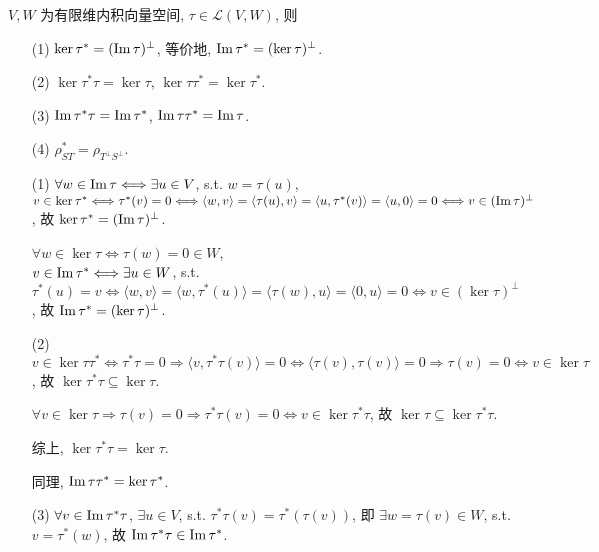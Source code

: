 \documentclass{note}
\begin{document}
\begin{thm}[(课本定理 10.3)]
    $V,W$ 为有限维内积向量空间, $\tau\in\mathcal{L}(V,W)$, 则
    \begin{itemize}
        \item[(1)] $\ker\tau^*=(\operatorname{Im}\tau)^{\perp}$, 等价地, $\operatorname{Im}\tau^*=(\ker\tau)^{\perp}$.
        \item[(2)] $\ker\tau^*\tau=\ker\tau$, $\ker\tau\tau^*=\ker\tau^*$.
        \item[(3)] $\operatorname{Im}\tau^*\tau=\operatorname{Im}\tau^*$, $\operatorname{Im}\tau\tau^*=\operatorname{Im}\tau$.
        \item[(4)] $\rho_{ST}^*=\rho_{T^{\perp}S^{\perp}}$.
    \end{itemize}
\end{thm}
\begin{pf}
    \begin{itemize}
        \item[(1)] $\forall w\in\operatorname{Im}\tau\Longleftrightarrow\exists u\in V$, s.t. $w=\tau(u)$,\\
        $v\in\ker\tau^*\Longleftrightarrow\tau^*(v)=0\Longleftrightarrow\langle w,v\rangle=\langle\tau(u),v\rangle=\langle u,\tau^*(v)\rangle=\langle u,0\rangle=0\Longleftrightarrow v\in(\operatorname{Im}\tau)^{\perp}$, 故 $\ker\tau^*=(\operatorname{Im}\tau)^{\perp}$.

        $\forall w\in\ker\tau\Longleftrightarrow\tau(w)=0\in W$,\\
        $v\in\operatorname{Im}\tau^*\Longleftrightarrow\exists u\in W$, s.t. $\tau^*(u)=v\Longleftrightarrow\langle w,v\rangle=\langle w,\tau^*(u)\rangle=\langle\tau(w),u\rangle=\langle 0,u\rangle=0\Longleftrightarrow v\in(\ker\tau)^{\perp}$, 故 $\operatorname{Im}\tau^*=(\ker\tau)^{\perp}$.
        \item[(2)] $v\in\ker\tau\tau^*\Longleftrightarrow\tau^*\tau=0\Longrightarrow\langle v,\tau^*\tau(v)\rangle=0\Longleftrightarrow\langle\tau(v),\tau(v)\rangle=0\Longrightarrow\tau(v)=0\Longleftrightarrow v\in\ker\tau$, 故 $\ker\tau^*\tau\subseteq\ker\tau$.

        $\forall v\in\ker\tau\Longrightarrow\tau(v)=0\Longrightarrow\tau^*\tau(v)=0\Longleftrightarrow v\in\ker\tau^*\tau$, 故 $\ker\tau\subseteq\ker\tau^*\tau$.

        综上, $\ker\tau^*\tau=\ker\tau$.

        同理, $\operatorname{Im}\tau\tau^*=\ker\tau^*$.
        \item[(3)] $\forall v\in\operatorname{Im}\tau^*\tau$, $\exists u\in V$, s.t. $\tau^*\tau(v)=\tau^*(\tau(v))$, 即 $\exists w=\tau(v)\in W$, s.t. $v=\tau^*(w)$, 故 $\operatorname{Im}\tau^*\tau\in\operatorname{Im}\tau^*$.


\end{itemize}
\end{pf}
\end{document}
